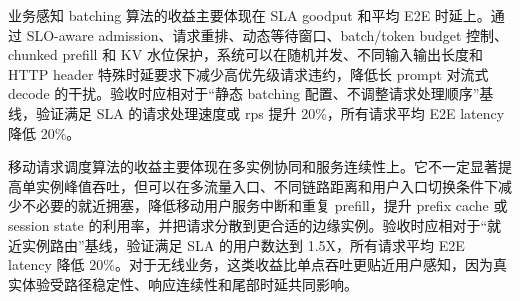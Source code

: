 业务感知 batching 算法的收益主要体现在 SLA goodput 和平均 E2E 时延上。通过 SLO-aware admission、请求重排、动态等待窗口、batch/token budget 控制、chunked prefill 和 KV 水位保护，系统可以在随机并发、不同输入输出长度和 HTTP header 特殊时延要求下减少高优先级请求违约，降低长 prompt 对流式 decode 的干扰。验收时应相对于“静态 batching 配置、不调整请求处理顺序”基线，验证满足 SLA 的请求处理速度或 rps 提升 20\%，所有请求平均 E2E latency 降低 20\%。

移动请求调度算法的收益主要体现在多实例协同和服务连续性上。它不一定显著提高单实例峰值吞吐，但可以在多流量入口、不同链路距离和用户入口切换条件下减少不必要的就近拥塞，降低移动用户服务中断和重复 prefill，提升 prefix cache 或 session state 的利用率，并把请求分散到更合适的边缘实例。验收时应相对于“就近实例路由”基线，验证满足 SLA 的用户数达到 1.5X，所有请求平均 E2E latency 降低 20\%。对于无线业务，这类收益比单点吞吐更贴近用户感知，因为真实体验受路径稳定性、响应连续性和尾部时延共同影响。
